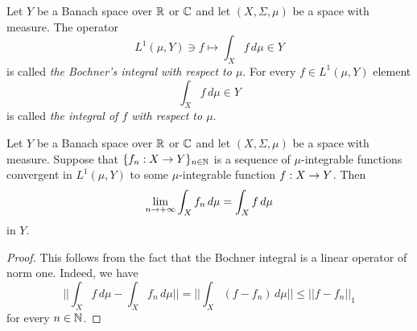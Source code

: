 \begin{definition}
Let $Y$ be a Banach space over ${\mathbb R}$ or ${\mathbb C}$ and let $(X,\Sigma,\mu)$ be a space with measure. The operator
$$L^1(\mu, Y)\ni f\mapsto \int_Xf\,d\mu\in Y$$
is called \textit{the Bochner's integral with respect to $\mu$}. For every $f\in L^1(\mu, Y)$ element
$$\int_Xf\,d\mu\in Y$$
is called \textit{the integral of $f$ with respect to $\mu$}.
\end{definition}

\begin{corollary}\label{corollary:convergence_of_integral}
Let $Y$ be a Banach space over ${\mathbb R}$ or ${\mathbb C}$ and let $(X,\Sigma,\mu)$ be a space with measure. Suppose that $\{f_n:X\rightarrow Y\}_{n\in {\mathbb N}}$ is a sequence of $\mu$-integrable functions convergent in $L^1(\mu, Y)$ to some $\mu$-integrable function $f:X\rightarrow Y$. Then
$$\lim_{n\rightarrow +\infty}\int_Xf_n\,d\mu = \int_Xf\,d\mu$$
in $Y$.
\end{corollary}
\begin{proof}
This follows from the fact that the Bochner integral is a linear operator of norm one. Indeed, we have
$$\bigg|\bigg|\int_Xf\,d\mu - \int_Xf_n\,d\mu\bigg|\bigg| = \bigg|\bigg|\int_X\left(f-f_n\right)\,d\mu\bigg|\bigg|\leq ||f - f_n||_1 $$
for every $n\in {\mathbb N}$.
\end{proof}

